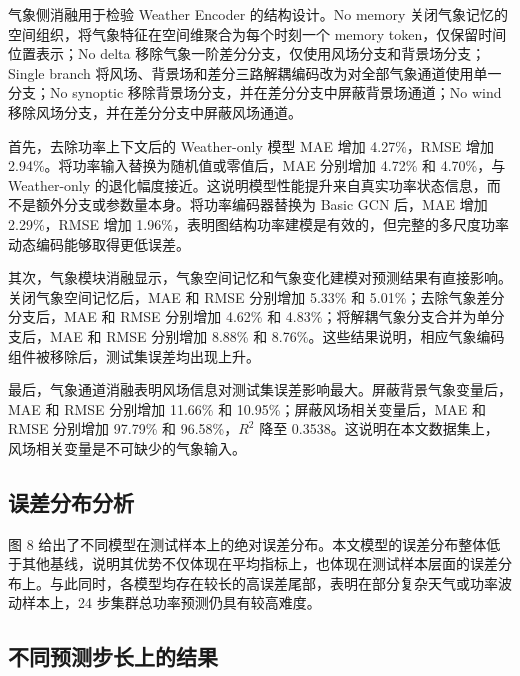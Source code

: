 气象侧消融用于检验 Weather Encoder 的结构设计。No memory 关闭气象记忆的空间组织，将气象特征在空间维聚合为每个时刻一个 memory token，仅保留时间位置表示；No delta 移除气象一阶差分分支，仅使用风场分支和背景场分支；Single branch 将风场、背景场和差分三路解耦编码改为对全部气象通道使用单一分支；No synoptic 移除背景场分支，并在差分分支中屏蔽背景场通道；No wind 移除风场分支，并在差分分支中屏蔽风场通道。


首先，去除功率上下文后的 Weather-only 模型 MAE 增加 4.27\%，RMSE 增加 2.94\%。将功率输入替换为随机值或零值后，MAE 分别增加 4.72\% 和 4.70\%，与 Weather-only 的退化幅度接近。这说明模型性能提升来自真实功率状态信息，而不是额外分支或参数量本身。将功率编码器替换为 Basic GCN 后，MAE 增加 2.29\%，RMSE 增加 1.96\%，表明图结构功率建模是有效的，但完整的多尺度功率动态编码能够取得更低误差。

其次，气象模块消融显示，气象空间记忆和气象变化建模对预测结果有直接影响。关闭气象空间记忆后，MAE 和 RMSE 分别增加 5.33\% 和 5.01\%；去除气象差分分支后，MAE 和 RMSE 分别增加 4.62\% 和 4.83\%；将解耦气象分支合并为单分支后，MAE 和 RMSE 分别增加 8.88\% 和 8.76\%。这些结果说明，相应气象编码组件被移除后，测试集误差均出现上升。

最后，气象通道消融表明风场信息对测试集误差影响最大。屏蔽背景气象变量后，MAE 和 RMSE 分别增加 11.66\% 和 10.95\%；屏蔽风场相关变量后，MAE 和 RMSE 分别增加 97.79\% 和 96.58\%，\(R^2\) 降至 0.3538。这说明在本文数据集上，风场相关变量是不可缺少的气象输入。


\subsection{误差分布分析}

图 8 给出了不同模型在测试样本上的绝对误差分布。本文模型的误差分布整体低于其他基线，说明其优势不仅体现在平均指标上，也体现在测试样本层面的误差分布上。与此同时，各模型均存在较长的高误差尾部，表明在部分复杂天气或功率波动样本上，24 步集群总功率预测仍具有较高难度。


\subsection{不同预测步长上的结果}


